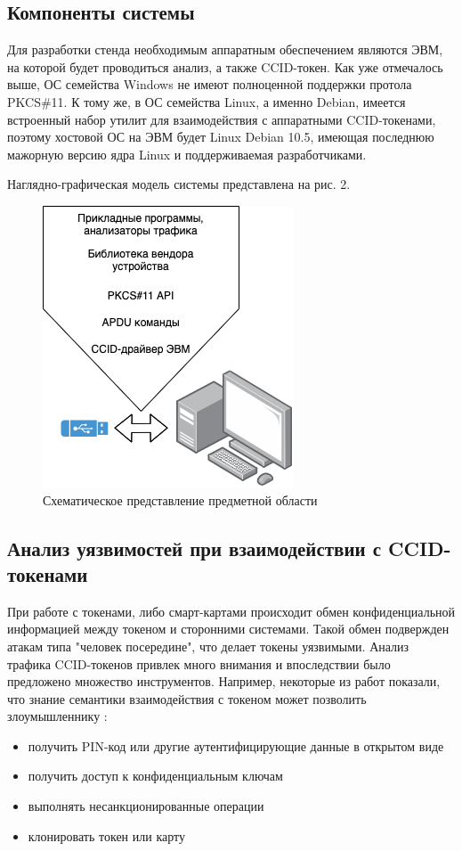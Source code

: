 \subsection{Компоненты системы}

Для разработки стенда необходимым аппаратным обеспечением являются ЭВМ, на которой будет проводиться анализ, а также CCID-токен.
Как уже отмечалось выше, ОС семейства Windows не имеют полноценной поддержки протола PKCS\#11. К тому же, в ОС семейства Linux, а именно Debian,
имеется встроенный набор утилит для взаимодействия с аппаратными CCID-токенами, поэтому хостовой ОС на ЭВМ будет Linux Debian 10.5,
имеющая последнюю мажорную версию ядра Linux и поддерживаемая разработчиками.

Наглядно-графическая модель системы представлена на рис. 2.

\begin{figure}[H]
  \hfill\includegraphics[scale=0.8]{images/general.png}\hspace*{\fill}
  \caption{Схематическое представление предметной области}
\end{figure}

\subsection{Анализ уязвимостей при взаимодействии с CCID-токенами}

При работе с токенами, либо смарт-картами происходит обмен конфиденциальной информацией между токеном и сторонними системами. Такой обмен
подвержден атакам типа "человек посередине", что делает токены уязвимыми. Анализ трафика CCID-токенов привлек много внимания и
впоследствии было предложено множество инструментов. Например, некоторые из работ показали, что знание семантики взаимодействия с токеном
может позволить злоумышленнику \cite{smart-logic, smart-detective}:
\begin{itemize}
  \item получить PIN-код или другие аутентифицирующие данные в открытом виде
  \item получить доступ к конфиденциальным ключам
  \item выполнять несанкционированные операции
  \item клонировать токен или карту
\end{itemize}

\clearpage
